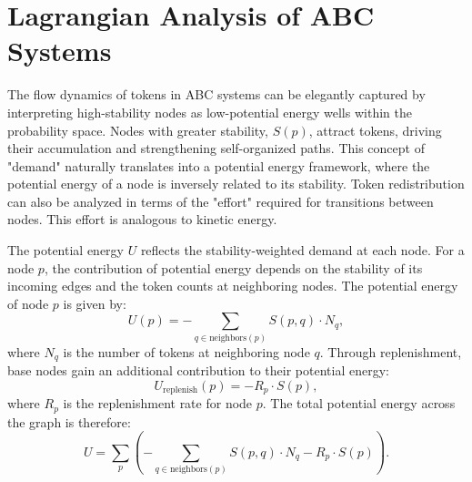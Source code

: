\documentclass[entropy,article,submit,pdftex,oneauthor]{Definitions/mdpi}
\begin{document}
\section{Lagrangian Analysis of ABC Systems}

The flow dynamics of tokens in ABC systems can be elegantly captured by interpreting high-stability nodes as low-potential energy wells within the probability space. Nodes with greater stability, \( S(p) \), attract tokens, driving their accumulation and strengthening self-organized paths. This concept of "demand" naturally translates into a potential energy framework, where the potential energy of a node is inversely related to its stability. Token redistribution can also be analyzed in terms of the "effort" required for transitions between nodes. This effort is analogous to kinetic energy.

The potential energy \( U \) reflects the stability-weighted demand at each node. For a node \( p \), the contribution of potential energy depends on the stability of its incoming edges and the token counts at neighboring nodes. The potential energy of node \( p \) is given by:
\begin{equation}
U(p) = -\sum_{q \in \text{neighbors}(p)} S(p, q) \cdot N_q,
\end{equation}
where \( N_q \) is the number of tokens at neighboring node \( q \). Through replenishment, base nodes gain an additional contribution to their potential energy:
\begin{equation}
U_{\text{replenish}}(p) = -R_p \cdot S(p),
\end{equation}
where \( R_p \) is the replenishment rate for node \( p \). The total potential energy across the graph is therefore:
\begin{equation}
U = \sum_{p} \left( -\sum_{q \in \text{neighbors}(p)} S(p, q) \cdot N_q - R_p \cdot S(p) \right).
\end{equation}
\end{document}
